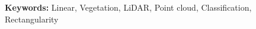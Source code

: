 \documentclass[12pt,a4paper]{article}
\begin{document}
	
%
%


{\bf Keywords:} Linear, Vegetation, LiDAR, Point cloud, Classification, Rectangularity









\clearpage

\end{document}
